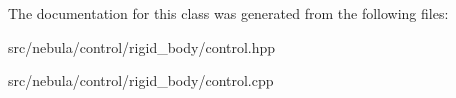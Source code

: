 The documentation for this class was generated from the following files:\begin{DoxyCompactItemize}
\item 
src/nebula/control/rigid\_\-body/control.hpp\item 
src/nebula/control/rigid\_\-body/control.cpp\end{DoxyCompactItemize}
